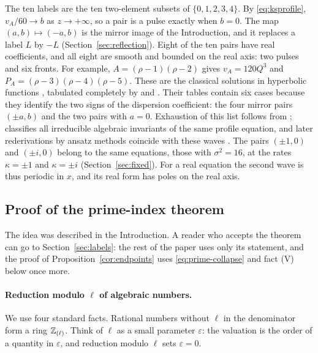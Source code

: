 The ten labels are the ten two-element subsets of \(\{0,1,2,3,4\}\). By
\eqref{eq:ksprofile}, \(v_A/60\to b\) as \(z\to+\infty\), so a pair is a
pulse exactly when \(b=0\). The map \((a,b)\mapsto(-a,b)\) is the mirror
image of the Introduction, and it replaces a label \(L\) by \(-L\)
(Section~\ref{sec:reflection}). Eight of the ten pairs have real
coefficients, and all eight are smooth and bounded on the real axis: two
pulses and six fronts. For example, \(A=(\rho-1)(\rho-2)\) gives
\(v_A=120Q^3\) and \(P_A=(\rho-3)(\rho-4)(\rho-5)\). These are the
classical solutions in hyperbolic functions
\citep{KuramotoTsuzuki1976,Kudryashov1988,Kudryashov1989,Kudryashov1990,Kudryashov1991},
tabulated completely by \citet[Table~1]{KudryashovZargaryan1996} and
\citet[Table~1]{ConteMusette2009}. Their tables contain six cases
because they identify the two signs of the dispersion coefficient: the
four mirror pairs \((\pm a,b)\) and the two pairs with \(a=0\).
Exhaustion of this list follows from \citet{Eremenko2006};
\citet{Demina2020} classifies all irreducible algebraic invariants of
the same profile equation, and later rederivations by ansatz methods
coincide with these waves \citep{KudryashovSoukharev2009}. The pairs
\((\pm1,0)\) and \((\pm i,0)\) belong to the same equations, those with
\(\sigma^2=16\), at the rates \(\kappa=\pm1\) and \(\kappa=\pm i\)
(Section~\ref{sec:fixed}). For a real equation the second wave is thus
periodic in \(x\), and its real form has poles on the real axis.

\subsection{Proof of the prime-index theorem}\label{sec:prime-proof}

The idea was described in the Introduction. A reader who accepts the
theorem can go to Section~\ref{sec:labels}: the rest of the paper uses
only its statement, and the proof of Proposition~\ref{cor:endpoints} uses
\eqref{eq:prime-collapse} and fact \textup{(V)} below once more.

\paragraph{Reduction modulo \(\ell\) of algebraic numbers.}
We use four standard facts. Rational numbers without \(\ell\) in the
denominator form a ring \(\mathbb Z_{(\ell)}\). Think of \(\ell\) as a small
parameter \(\varepsilon\): the valuation is the order of a quantity in
\(\varepsilon\), and reduction modulo \(\ell\) sets \(\varepsilon=0\).

